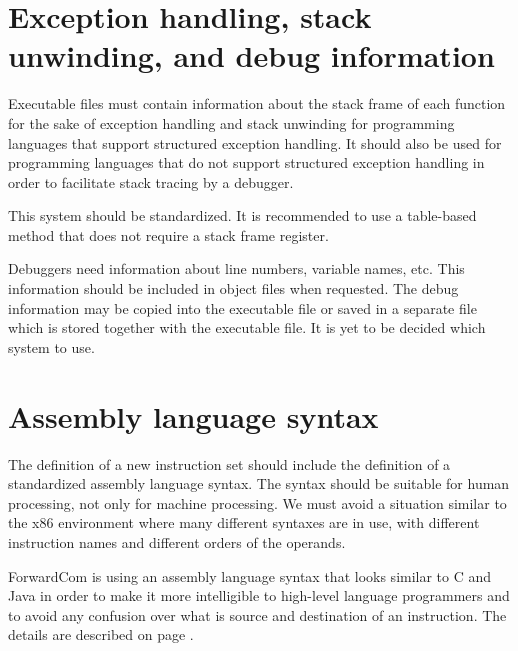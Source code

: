 \documentclass[forwardcom.tex]{subfiles}
\begin{document}
\section{Exception handling, stack unwinding, and debug information} \label{exceptionHandling}
Executable files must contain information about the stack frame of each function for the sake of exception handling and stack unwinding for programming languages that support structured exception handling. 
It should also be used for programming languages that do not support structured exception handling in order to facilitate stack tracing by a debugger. 
\vv

This system should be standardized.  
It is recommended to use a table-based method that does not require a stack frame register. 
\vv

Debuggers need information about line numbers, variable names, etc. This information should be included in object files when requested. The debug information may be copied into the executable file or saved in a separate file which is stored together with the executable file. It is yet to be decided which system to use. 


\section{Assembly language syntax} \label{StandardizationAssemblySyntax}
The definition of a new instruction set should include the definition of a standardized assembly language syntax. The syntax should be suitable for human processing, not only for machine processing. We must avoid a situation similar to the x86 environment where many different syntaxes are in use, with different instruction names and different orders of the operands. 
\vv

ForwardCom is using an assembly language syntax that looks similar to C and Java in order to make it more intelligible to high-level language programmers and to avoid any confusion over what is source and destination of an instruction. The details are described on page \pageref{AssemblyLanguageSyntax}.
\end{document}
